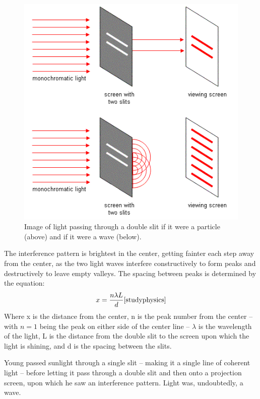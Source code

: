 \documentclass[prb,preprint]{revtex4-1}
\begin{document}
\begin{figure}[h!]
\centering
\includegraphics[width=6in]{DoubleSlitPicsStudyPhysicsCa.png}
\caption{Image of light passing through a double slit if it were a particle (above) and if it were a wave (below).\cite{studyphysics}}
\label{PartVsWave}
\end{figure}

The interference pattern is brightest in the center, getting fainter each step away from the center, as the two light waves interfere constructively to form peaks and destructively to leave empty valleys. The spacing between peaks is determined by the equation:
\begin{equation}
\label{DblIntfr}
x = \frac{n\lambda L}{d}\cite{studyphysics}
\end{equation}
Where x is the distance from the center, n is the peak number from the center – with $n=1$ being the peak on either side of the center line – $\lambda$ is the wavelength of the light, L is the distance from the double slit to the screen upon which the light is shining, and d is the spacing between the slits.

Young passed sunlight through a single slit – making it a single line of coherent light – before letting it pass through a double slit and then onto a projection screen, upon which he saw an interference pattern. Light was, undoubtedly, a wave.
\end{document}
